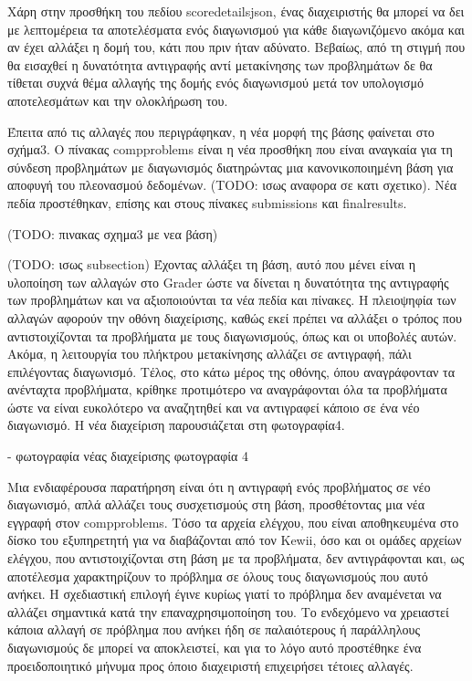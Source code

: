 \documentclass[diploma]{softlab-thesis}
\begin{document}
\bigskip

Χάρη στην προσθήκη του πεδίου scoredetailsjson, ένας διαχειριστής θα μπορεί να δει
με λεπτομέρεια τα αποτελέσματα ενός διαγωνισμού για κάθε διαγωνιζόμενο ακόμα και
αν έχει αλλάξει η δομή του, κάτι που πριν ήταν αδύνατο. Βεβαίως, από τη στιγμή που
θα εισαχθεί η δυνατότητα αντιγραφής αντί μετακίνησης των προβλημάτων δε θα τίθεται
συχνά θέμα αλλαγής της δομής ενός διαγωνισμού μετά τον υπολογισμό αποτελεσμάτων και
την ολοκλήρωση του.

\bigskip

Έπειτα από τις αλλαγές που περιγράφηκαν, η νέα μορφή της βάσης φαίνεται στο σχήμα3.
Ο πίνακας compproblems είναι η νέα προσθήκη που είναι αναγκαία για τη σύνδεση
προβλημάτων με διαγωνισμός διατηρώντας μια κανονικοποιημένη βάση για αποφυγή του
πλεονασμού δεδομένων. (TODO: ισως αναφορα σε κατι σχετικο). Νέα πεδία προστέθηκαν,
επίσης και στους πίνακες submissions και finalresults.

\bigskip

(TODO: πινακας σχημα3 με νεα βάση)

\bigskip

(TODO: ισως subsection) Έχοντας αλλάξει τη βάση, αυτό που μένει είναι η
υλοποίηση των αλλαγών στο Grader ώστε να δίνεται η δυνατότητα της αντιγραφής
των προβλημάτων και να αξιοποιούνται τα νέα πεδία και πίνακες. Η πλειοψηφία των
αλλαγών αφορούν την οθόνη διαχείρισης, καθώς εκεί πρέπει να αλλάξει ο τρόπος
που αντιστοιχίζονται τα προβλήματα με τους διαγωνισμούς, όπως και οι υποβολές
αυτών. Ακόμα, η λειτουργία του πλήκτρου μετακίνησης αλλάζει σε αντιγραφή, πάλι
επιλέγοντας διαγωνισμό. Τέλος, στο κάτω μέρος της οθόνης, όπου αναγράφονταν τα
ανένταχτα προβλήματα, κρίθηκε προτιμότερο να αναγράφονται όλα τα προβλήματα
ώστε να είναι ευκολότερο να αναζητηθεί και να αντιγραφεί κάποιο σε ένα νέο
διαγωνισμό. Η νέα διαχείριση παρουσιάζεται στη φωτογραφία4.

\bigskip

- φωτογραφία νέας διαχείρισης φωτογραφία 4

\bigskip

Μια ενδιαφέρουσα παρατήρηση είναι ότι η αντιγραφή ενός προβλήματος σε νέο
διαγωνισμό, απλά αλλάζει τους συσχετισμούς στη βάση, προσθέτοντας μια νέα
εγγραφή στον compproblems. Τόσο τα αρχεία ελέγχου, που είναι αποθηκευμένα στο
δίσκο του εξυπηρετητή για να διαβάζονται από τον Kewii, όσο και οι ομάδες
αρχείων ελέγχου, που αντιστοιχίζονται στη βάση με τα προβλήματα, δεν
αντιγράφονται και, ως αποτέλεσμα χαρακτηρίζουν το πρόβλημα σε όλους τους
διαγωνισμούς που αυτό ανήκει. Η σχεδιαστική επιλογή έγινε κυρίως γιατί το
πρόβλημα δεν αναμένεται να αλλάζει σημαντικά κατά την επαναχρησιμοποίηση του.
Το ενδεχόμενο να χρειαστεί κάποια αλλαγή σε πρόβλημα που ανήκει ήδη σε
παλαιότερους ή παράλληλους διαγωνισμούς δε μπορεί να αποκλειστεί, και για το
λόγο αυτό προστέθηκε ένα προειδοποιητικό μήνυμα προς όποιο διαχειριστή
επιχειρήσει τέτοιες αλλαγές.
\end{document}
